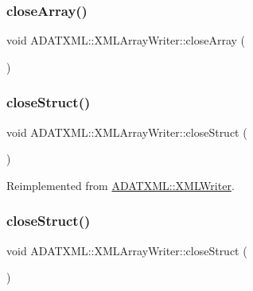 \subsubsection{\texorpdfstring{closeArray()}{closeArray()}\hspace{0.1cm}{\footnotesize\ttfamily [3/3]}}
{\footnotesize\ttfamily void A\+D\+A\+T\+X\+M\+L\+::\+X\+M\+L\+Array\+Writer\+::close\+Array (\begin{DoxyParamCaption}{ }\end{DoxyParamCaption})}

\mbox{\label{classADATXML_1_1XMLArrayWriter_a5a849f8851bce99654c44dc08b1fe486}} 
\subsubsection{\texorpdfstring{closeStruct()}{closeStruct()}\hspace{0.1cm}{\footnotesize\ttfamily [1/3]}}
{\footnotesize\ttfamily void A\+D\+A\+T\+X\+M\+L\+::\+X\+M\+L\+Array\+Writer\+::close\+Struct (\begin{DoxyParamCaption}{ }\end{DoxyParamCaption})\hspace{0.3cm}{\ttfamily [virtual]}}



Reimplemented from \mbox{\hyperlink{classADATXML_1_1XMLWriter_ade5512a07806893fe3aaebb897580569}{A\+D\+A\+T\+X\+M\+L\+::\+X\+M\+L\+Writer}}.

\mbox{\label{classADATXML_1_1XMLArrayWriter_a5a849f8851bce99654c44dc08b1fe486}} 
\subsubsection{\texorpdfstring{closeStruct()}{closeStruct()}\hspace{0.1cm}{\footnotesize\ttfamily [2/3]}}
{\footnotesize\ttfamily void A\+D\+A\+T\+X\+M\+L\+::\+X\+M\+L\+Array\+Writer\+::close\+Struct (\begin{DoxyParamCaption}{ }\end{DoxyParamCaption})\hspace{0.3cm}{\ttfamily [virtual]}}



